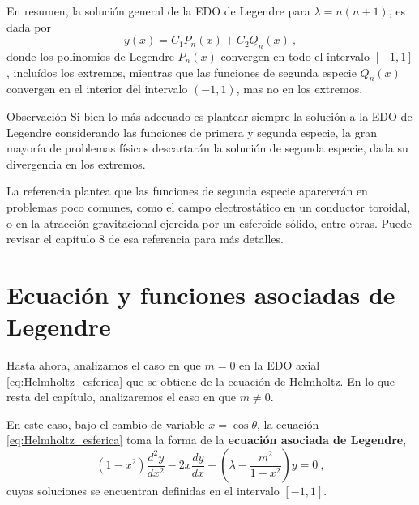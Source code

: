 

En resumen, la solución general de la EDO de Legendre para $\lambda = n(n+1)$, es dada por
\begin{equation}
    y(x) = C_1 P_n(x) + C_2 Q_n(x) \ ,
\end{equation}
donde los polinomios de Legendre $P_n(x)$ convergen en todo el intervalo $[-1,1]$, incluídos los extremos, mientras que las funciones de segunda especie $Q_n(x)$ convergen en el interior del intervalo $(-1,1)$, mas no en los extremos.

\begin{obs}{Observación}
    Si bien lo más adecuado es plantear siempre la solución a la EDO de Legendre considerando las funciones de primera y segunda especie, la gran mayoría de problemas físicos descartarán la solución de segunda especie, dada su divergencia en los extremos.

    La referencia \cite{Lebedev_Silverman_1972} plantea que las funciones de segunda especie aparecerán en problemas poco comunes, como el campo electrostático en un conductor toroidal, o en la atracción gravitacional ejercida por un esferoide sólido, entre otras. Puede revisar el capítulo 8 de esa referencia para más detalles.
\end{obs}

\section{Ecuación y funciones asociadas de Legendre}

Hasta ahora, analizamos el caso en que $m=0$ en la EDO axial \eqref{eq:Helmholtz_esferica} que se obtiene de la ecuación de Helmholtz. En lo que resta del capítulo, analizaremos el caso en que $m \neq 0$.

En este caso, bajo el cambio de variable $x=\cos\theta$, la ecuación \eqref{eq:Helmholtz_esferica} toma la forma de la 
%
\textbf{ecuación asociada de Legendre},
\begin{equation}\label{eq:EDO_asociada_Legendre}
    (1-x^2) \frac{d^2y}{dx^2} - 2x\frac{dy}{dx} + \left( \lambda - \frac{m^2}{1-x^2} \right) y = 0 \ ,
\end{equation}
cuyas soluciones se encuentran definidas en el intervalo $[-1,1]$.

